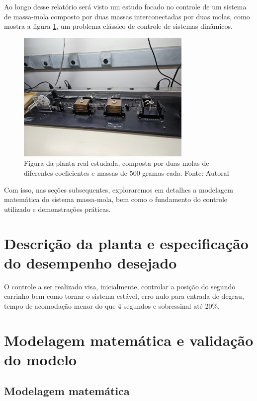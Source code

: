 \documentclass{ifacconf}
\begin{document}
Ao longo desse relatório será visto um estudo focado no controle de um sistema de massa-mola 
composto por duas massas interconectadas por duas molas, como mostra a figura \ref{fig:planta_padrao}, um problema
clássico de controle de sistemas dinâmicos. 

\begin{figure}[!htb]
  \begin{center}
  \includegraphics[width=8.4cm]{figures/planta_padrao.jpg}    %
  \caption{Figura da planta real estudada, composta por duas molas de diferentes coeficientes e massas de 500 gramas cada. Fonte: Autoral} 
  \label{fig:planta_padrao}
  \end{center}
\end{figure}

Com isso, nas seções subsequentes, exploraremos em detalhes a modelagem matemática do sistema
massa-mola, bem como o fundamento do controle utilizado e demonstrações práticas.

\section{Descrição da planta e especificação do desempenho desejado}

O controle a ser realizado visa, inicialmente, controlar a posição do segundo carrinho bem como tornar o sistema estável, erro nulo para entrada de degrau, 
tempo de acomodação menor do que 4 segundos e sobressinal até 20\%.

\section{Modelagem matemática e validação do modelo}



\subsection{Modelagem matemática}
\end{document}
